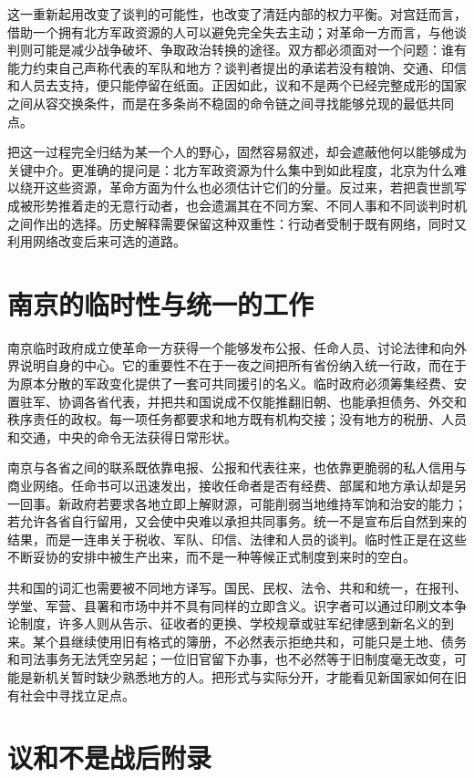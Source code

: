 这一重新起用改变了谈判的可能性，也改变了清廷内部的权力平衡。对宫廷而言，借助一个拥有北方军政资源的人可以避免完全失去主动；对革命一方而言，与他谈判则可能是减少战争破坏、争取政治转换的途径。双方都必须面对一个问题：谁有能力约束自己声称代表的军队和地方？谈判者提出的承诺若没有粮饷、交通、印信和人员去支持，便只能停留在纸面。正因如此，议和不是两个已经完整成形的国家之间从容交换条件，而是在多条尚不稳固的命令链之间寻找能够兑现的最低共同点。

把这一过程完全归结为某一个人的野心，固然容易叙述，却会遮蔽他何以能够成为关键中介。更准确的提问是：北方军政资源为什么集中到如此程度，北京为什么难以绕开这些资源，革命方面为什么也必须估计它们的分量。反过来，若把袁世凯写成被形势推着走的无意行动者，也会遗漏其在不同方案、不同人事和不同谈判时机之间作出的选择。历史解释需要保留这种双重性：行动者受制于既有网络，同时又利用网络改变后来可选的道路。

\section{南京的临时性与统一的工作}

南京临时政府成立使革命一方获得一个能够发布公报、任命人员、讨论法律和向外界说明自身的中心。它的重要性不在于一夜之间把所有省份纳入统一行政，而在于为原本分散的军政变化提供了一套可共同援引的名义。临时政府必须筹集经费、安置驻军、协调各省代表，并把共和国说成不仅能推翻旧朝、也能承担债务、外交和秩序责任的政权。每一项任务都要求和地方既有机构交接；没有地方的税册、人员和交通，中央的命令无法获得日常形状。

南京与各省之间的联系既依靠电报、公报和代表往来，也依靠更脆弱的私人信用与商业网络。任命书可以迅速发出，接收任命者是否有经费、部属和地方承认却是另一回事。新政府若要求各地立即上解财源，可能削弱当地维持军饷和治安的能力；若允许各省自行留用，又会使中央难以承担共同事务。统一不是宣布后自然到来的结果，而是一连串关于税收、军队、印信、法律和人员的谈判。临时性正是在这些不断妥协的安排中被生产出来，而不是一种等候正式制度到来时的空白。

共和国的词汇也需要被不同地方译写。国民、民权、法令、共和和统一，在报刊、学堂、军营、县署和市场中并不具有同样的立即含义。识字者可以通过印刷文本争论制度，许多人则从告示、征收者的更换、学校规章或驻军纪律感到新名义的到来。某个县继续使用旧有格式的簿册，不必然表示拒绝共和，可能只是土地、债务和司法事务无法凭空另起；一位旧官留下办事，也不必然等于旧制度毫无改变，可能是新机关暂时缺少熟悉地方的人。把形式与实际分开，才能看见新国家如何在旧有社会中寻找立足点。

\section{议和不是战后附录}


